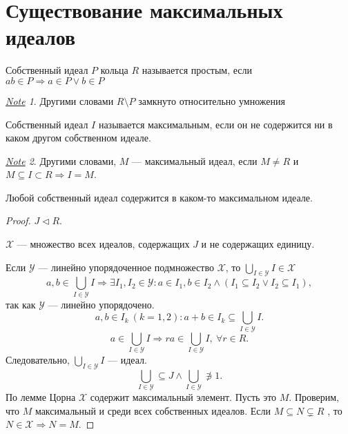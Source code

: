 \documentclass[11pt]{book}
\theoremstyle{definition}
\theoremstyle{plain}
\theoremstyle{plain}
\theoremstyle{definition}
\theoremstyle{remark}
\newtheorem*{note}{\underline{Note}}
\begin{document}
\section{Существование максимальных идеалов}
\begin{defn}
    Собственный идеал $ P$ кольца $ R$ называется простым, если $ ab \in  P \Rightarrow a \in  P \vee b \in  P$ 
\end{defn}
\begin{note}
    Другими словами $ R \setminus P$ замкнуто относительно умножения
\end{note}
\begin{defn}
    Собственный идеал $ I$ называется {\sf максимальным}, если он не содержится ни в каком другом собственном идеале. 
\end{defn}
\begin{note}
     Другими словами, $ M$ --- максимальный идеал, если $ M \ne R$ и $ M \subseteq I \subset R \Rightarrow I = M$.
\end{note}
\begin{thm}
    Любой собственный идеал содержится в каком-то максимальном идеале.
\end{thm}
\begin{proof}
    $ J \vartriangleleft R$. %

    $ \mathcal{X}$ --- множество всех идеалов, содержащих $ J$ и не содержащих единицу.

    Если $\mathcal{Y}$ --- линейно упорядоченное подмножество $ \mathcal{X}$, то $ \bigcup_{I \in \mathcal{Y}} I \in \mathcal{X}$
    \[
	a, b \in  \bigcup_{I \in \mathcal{Y}} I \Longrightarrow \exists I_1, I_2 \in \mathcal{Y}: a \in  I_1, b \in I_2 \wedge (I_1 \subseteq I_2 \vee I_2 \subseteq I_1) 
    ,\] 
    так как $\mathcal{Y}$ --- линейно упорядочено.
    \[
	a, b \in  I_k ~(k = 1, 2): a+b \in  I_k \subseteq \bigcup_{I \in \mathcal{Y}}  I
    .\] 
    \[
    a \in  \bigcup_{I \in  \mathcal Y} I \Longrightarrow ra \in  \bigcup_{I \in  \mathcal Y} I, ~ \forall r \in  R
    .\] 
    Следовательно, $ \bigcup_{I \in \mathcal{Y}} I $ --- идеал.
    \[
    \bigcup_{I \in\mathcal{Y}} \subseteq J \wedge \bigcup_{ I \in \mathcal{Y}} \not\ni 1 
    .\] 
    По лемме Цорна $ \mathcal{X}$ содержит максимальный элемент. Пусть это $ M$.
    Проверим, что $ M$ максимальный и среди всех собственных идеалов.
    Если $ M \subseteq N \subsetneq R$ %
    , то $ N \in  \mathcal{X} \Rightarrow  N = M$.
\end{proof}
\end{document}
